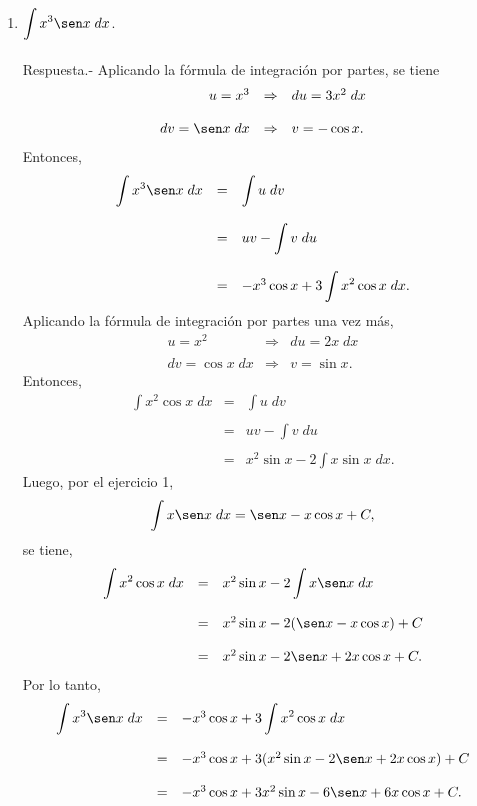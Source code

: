 \begin{enumerate}[\bfseries 1.]
	\item $\displaystyle\int x^3 \sen x\; dx$.\\\\
	    Respuesta.-\; Aplicando la fórmula de integración por partes, se tiene
	    $$\begin{array}{rcl}
		u=x^3 &\Rightarrow& du=3x^2\; dx\\\\
		dv=\sen x\; dx &\Rightarrow& v=-\cos x.
	    \end{array}$$
	    Entonces,
	    $$\begin{array}{rcl}
		\displaystyle\int x^3\sen x\; dx &=& \displaystyle\int u\; dv\\\\
					       &=& uv - \displaystyle\int v\; du\\\\
					       &=& -x^3\cos x + 3\displaystyle\int x^2\cos x\; dx.
	    \end{array}$$
	    Aplicando la fórmula de integración por partes una vez más,
	    $$\begin{array}{rcl}
		u=x^2 &\Rightarrow& du=2x\; dx\\\\
		dv=\cos x\; dx &\Rightarrow& v=\sin x.
	    \end{array}$$
	    Entonces,
	    $$\begin{array}{rcl}
		\displaystyle\int x^2\cos x\; dx &=& \displaystyle\int u\; dv\\\\
					       &=& uv - \displaystyle\int v\; du\\\\
					       &=& x^2\sin x - 2\displaystyle\int x \sin x\; dx.
	    \end{array}$$
	    Luego, por el ejercicio 1,
	    $$\int x\sen x \; dx = \sen x - x\cos x + C,$$
	    se tiene,
	    $$\begin{array}{rcl}
		\displaystyle\int x^2\cos x\; dx &=& x^2\sin x - 2\displaystyle\int x\sen x\; dx\\\\
						 &=& x^2\sin x - 2(\sen x - x\cos x) + C\\\\
						 &=& x^2\sin x - 2\sen x + 2x\cos x + C.
	    \end{array}$$
	    Por lo tanto,
	    $$\begin{array}{rcl}
		\displaystyle\int x^3\sen x\; dx &=& -x^3\cos x + 3\displaystyle\int x^2\cos x\; dx\\\\
						 &=& -x^3\cos x + 3(x^2\sin x - 2\sen x + 2x\cos x) + C\\\\
						 &=& -x^3\cos x + 3x^2\sin x - 6\sen x + 6x\cos x + C.
	    \end{array}$$
	    \vspace{0.5cm}


\end{enumerate}

